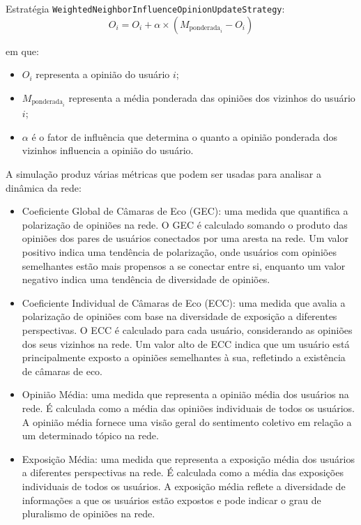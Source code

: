 Estratégia \texttt{WeightedNeighborInfluenceOpinionUpdateStrategy}:
\begin{equation*}
	O_i = O_i + \alpha \times (M_{\text{ponderada}_i} - O_i)
\end{equation*}

em que:

\begin{itemize}
	\item $O_i$ representa a opinião do usuário $i$;
	\item $M_{\text{ponderada}_i}$ representa a média ponderada das opiniões dos vizinhos do usuário $i$;
	\item $\alpha$ é o fator de influência que determina o quanto a opinião ponderada dos vizinhos influencia a opinião do usuário.
\end{itemize}

A simulação produz várias métricas que podem ser usadas para analisar a dinâmica da rede:

\begin{itemize}
	\item Coeficiente Global de Câmaras de Eco (GEC): uma medida que quantifica a polarização de opiniões na rede. O GEC é calculado somando o produto das opiniões dos pares de usuários conectados por uma aresta na rede. Um valor positivo indica uma tendência de polarização, onde usuários com opiniões semelhantes estão mais propensos a se conectar entre si, enquanto um valor negativo indica uma tendência de diversidade de opiniões.
	\item Coeficiente Individual de Câmaras de Eco (ECC): uma medida que avalia a polarização de opiniões com base na diversidade de exposição a diferentes perspectivas. O ECC é calculado para cada usuário, considerando as opiniões dos seus vizinhos na rede. Um valor alto de ECC indica que um usuário está principalmente exposto a opiniões semelhantes à sua, refletindo a existência de câmaras de eco.
	\item Opinião Média: uma medida que representa a opinião média dos usuários na rede. É calculada como a média das opiniões individuais de todos os usuários. A opinião média fornece uma visão geral do sentimento coletivo em relação a um determinado tópico na rede.
	\item Exposição Média: uma medida que representa a exposição média dos usuários a diferentes perspectivas na rede. É calculada como a média das exposições individuais de todos os usuários. A exposição média reflete a diversidade de informações a que os usuários estão expostos e pode indicar o grau de pluralismo de opiniões na rede.
\end{itemize}


